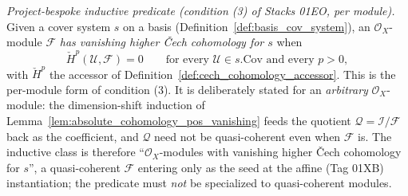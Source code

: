 \begin{definition}

  \label{def:has_vanishing_higher_cech}
  \textit{Project-bespoke inductive predicate (condition (3) of Stacks 01EO, per module).}
  Given a cover system \(s\) on a basis (Definition~\ref{def:basis_cov_system}), an
  \(\mathcal{O}_X\)-module \(\mathcal{F}\) \emph{has vanishing higher {\v C}ech cohomology for
  \(s\)} when
  \[
    \check{H}^p(\mathcal{U}, \mathcal{F}) = 0 \qquad
      \text{for every } \mathcal{U} \in s.\mathrm{Cov} \text{ and every } p > 0,
  \]
  with \(\check{H}^p\) the accessor of Definition~\ref{def:cech_cohomology_accessor}. This is the
  per-module form of condition (3). It is deliberately stated for an \emph{arbitrary}
  \(\mathcal{O}_X\)-module: the dimension-shift induction of
  Lemma~\ref{lem:absolute_cohomology_pos_vanishing} feeds the quotient \(\mathcal{Q} =
  \mathcal{I}/\mathcal{F}\) back as the coefficient, and \(\mathcal{Q}\) need not be quasi-coherent
  even when \(\mathcal{F}\) is. The inductive class is therefore ``\(\mathcal{O}_X\)-modules with
  vanishing higher {\v C}ech cohomology for \(s\)'', a quasi-coherent \(\mathcal{F}\) entering only
  as the seed at the affine (Tag 01XB) instantiation; the predicate must \emph{not} be specialized
  to quasi-coherent modules.
\end{definition}

